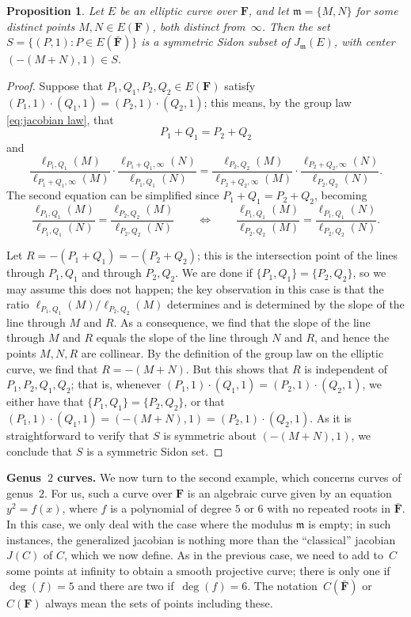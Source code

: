 \documentclass[12pt]{amsart}
\numberwithin{equation}{section}
\newcommand{\Ff}{\mathbf{F}}
\newcommand{\mfm}{\mathfrak{m}}
\theoremstyle{plain}
\newtheorem{proposition}[theorem]{Proposition}
\theoremstyle{remark}
\theoremstyle{definition}
\begin{document}
\begin{proposition}
  Let $E$ be an elliptic curve over $\Ff$, and let $\mfm = \{M,N\}$
  for some distinct points $M,N \in E(\Ff)$, both distinct
  from~$\infty$. Then the set $S = \{(P,1) : P \in E(\bar{\Ff})\}$ is
  a symmetric Sidon subset of $J_\mfm(E)$, with center
  $(-(M+N),1) \in S$.
\end{proposition}

\begin{proof}
  Suppose that $P_1,Q_1,P_2,Q_2 \in E(\Ff)$ satisfy
  $(P_1,1)\cdot (Q_1,1) = (P_2,1)\cdot (Q_2,1)$; this means, by the
  group law \eqref{eq:jacobian law}, that
  \[
    P_1+Q_1 = P_2+Q_2
  \]
  and
  \[
    \frac{\ell_{P_1,Q_1}(M)}{\ell_{P_1+Q_1,\infty}(M)}\cdot
    \frac{\ell_{P_1+Q_1,\infty}(N)}{\ell_{P_1,Q_1}(N)}=
    \frac{\ell_{P_2,Q_2}(M)}{\ell_{P_2+Q_2,\infty}(M)}\cdot
    \frac{\ell_{P_2+Q_2,\infty}(N)}{\ell_{P_2,Q_2}(N)}.
  \]
  The second equation can be simplified since $P_1+Q_1=P_2+Q_2$,
  becoming
  \[
    \frac{\ell_{P_1,Q_1}(M)}{\ell_{P_1,Q_1}(N)} =
    \frac{\ell_{P_2,Q_2}(M)}{\ell_{P_2,Q_2}(N)}
    \qquad\Longleftrightarrow\qquad
    \frac{\ell_{P_1,Q_1}(M)}{\ell_{P_2,Q_2}(M)} =
    \frac{\ell_{P_1,Q_1}(N)}{\ell_{P_2,Q_2}(N)}.
  \]
  
  Let $R=-(P_1+Q_1)=-(P_2+Q_2)$; this is the intersection point of the
  lines through $P_1,Q_1$ and through $P_2,Q_2$. We are done if
  $\{P_1,Q_1\}=\{P_2,Q_2\}$, so we may assume this does not happen;
  the key observation in this case is that the ratio
  $\ell_{P_1,Q_1}(M)/\ell_{P_2,Q_2}(M)$ determines and is determined
  by the slope of the line through $M$ and $R$. As a consequence, we
  find that the slope of the line through $M$ and $R$ equals the slope
  of the line through $N$ and $R$, and hence the points $M,N,R$ are
  collinear. By the definition of the group law on the elliptic curve,
  we find that $R=-(M+N)$. But this shows that $R$ is independent of
  $P_1,P_2,Q_1,Q_2$; that is, whenever
  $(P_1,1)\cdot (Q_1,1)=(P_2,1)\cdot (Q_2,1)$, we either have that
  $\{P_1,Q_1\}=\{P_2,Q_2\}$, or that
  $(P_1,1)\cdot (Q_1,1)=(-(M+N),1)=(P_2,1)\cdot (Q_2,1)$. As it is
  straightforward to verify that $S$ is symmetric about $(-(M+N),1)$,
  we conclude that $S$ is a symmetric Sidon set.
\end{proof}

\textbf{Genus~$2$ curves.} We now turn to the second example, which
concerns curves of genus~$2$. For us, such a curve over $\Ff$ is an
algebraic curve given by an equation $y^2=f(x)$, where $f$ is a
polynomial of degree $5$ or $6$ with no repeated roots in
$\bar{\Ff}$. In this case, we only deal with the case where the
modulus $\mfm$ is empty; in such instances, the generalized jacobian
is nothing more than the ``classical'' jacobian $J(C)$ of $C$, which
we now define. As in the previous case, we need to add to~$C$ some
points at infinity to obtain a smooth projective curve; there is only
one if~$\deg(f)=5$ and there are two if~$\deg(f)=6$. The
notation~$C(\bar{\Ff})$ or~$C(\Ff)$ always mean the sets of points
including these.
\end{document}
